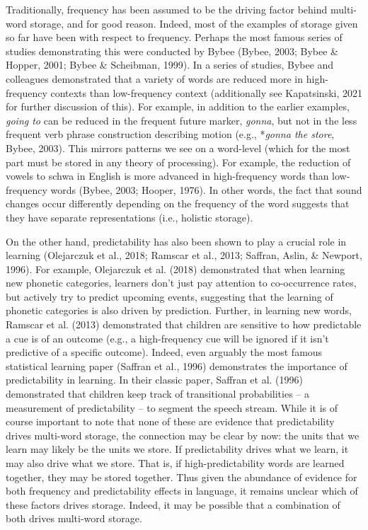 \documentclass[
  man,floatsintext]{apa6}
\begin{document}
Traditionally, frequency has been assumed to be the driving factor behind multi-word storage, and for good reason. Indeed, most of the examples of storage given so far have been with respect to frequency. Perhaps the most famous series of studies demonstrating this were conducted by Bybee (Bybee, 2003; Bybee \& Hopper, 2001; Bybee \& Scheibman, 1999). In a series of studies, Bybee and colleagues demonstrated that a variety of words are reduced more in high-frequency contexts than low-frequency context (additionally see Kapatsinski, 2021 for further discussion of this). For example, in addition to the earlier examples, \emph{going to} can be reduced in the frequent future marker, \emph{gonna}, but not in the less frequent verb phrase construction describing motion (e.g., *\emph{gonna the store}, Bybee, 2003). This mirrors patterns we see on a word-level (which for the most part must be stored in any theory of processing). For example, the reduction of vowels to schwa in English is more advanced in high-frequency words than low-frequency words (Bybee, 2003; Hooper, 1976). In other words, the fact that sound changes occur differently depending on the frequency of the word suggests that they have separate representations (i.e., holistic storage).

On the other hand, predictability has also been shown to play a crucial role in learning (Olejarczuk et al., 2018; Ramscar et al., 2013; Saffran, Aslin, \& Newport, 1996). For example, Olejarczuk et al. (2018) demonstrated that when learning new phonetic categories, learners don't just pay attention to co-occurrence rates, but actively try to predict upcoming events, suggesting that the learning of phonetic categories is also driven by prediction. Further, in learning new words, Ramscar et al. (2013) demonstrated that children are sensitive to how predictable a cue is of an outcome (e.g., a high-frequency cue will be ignored if it isn't predictive of a specific outcome). Indeed, even arguably the most famous statistical learning paper (Saffran et al., 1996) demonstrates the importance of predictability in learning. In their classic paper, Saffran et al. (1996) demonstrated that children keep track of transitional probabilities -- a measurement of predictability -- to segment the speech stream. While it is of course important to note that none of these are evidence that predictability drives multi-word storage, the connection may be clear by now: the units that we learn may likely be the units we store. If predictability drives what we learn, it may also drive what we store. That is, if high-predictability words are learned together, they may be stored together. Thus given the abundance of evidence for both frequency and predictability effects in language, it remains unclear which of these factors drives storage. Indeed, it may be possible that a combination of both drives multi-word storage.
\end{document}

